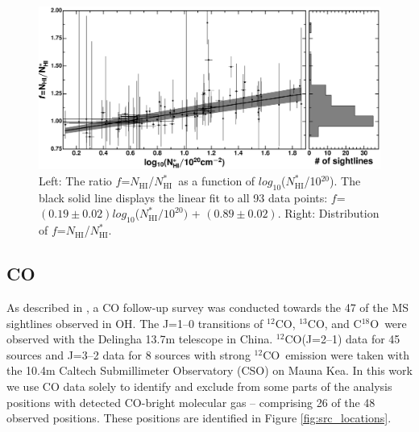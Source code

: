 \documentclass[preprint]{emulateapj}
\def\13co{$^{13}$CO}
\def\c18o{C$^{18}$O}
\def\co{$^{12}$CO}
\def\h2{H$_2$}
\def\hi{H{\sc i}}
\def\NHI{$N_\mathrm{HI}$}
\def\NHIthin{$N^{*}_\mathrm{HI}$}
\begin{document}

\begin{figure}
\includegraphics[width=1.0\linewidth]{fig/ratio_vs_nhithin.eps}
\caption{Left: The ratio $f$=\NHI/\NHIthin\ as a function of $log_{10}$(\NHIthin/10$^{20}$). The black solid line displays the linear fit to all 93 data points: $f$=$(0.19\pm0.02)log_{10}$(\NHIthin$/10^{20})$ + $(0.89\pm0.02)$. Right: Distribution of $f$=\NHI/\NHIthin.}
\label{fig:ratio_vs_nhithin}
\end{figure}

\subsection{CO}
\label{subsec:CO}
As described in \citet{Li2017}, a CO follow-up survey was conducted towards the 47 of the MS sightlines observed in OH. The J=1--0 transitions of \co, \13co, and \c18o\ were observed with the Delingha 13.7m telescope in China. \co(J=2--1) data for 45 sources and J=3--2 data for 8 sources with strong \co\ emission were taken with the 10.4m Caltech Submillimeter Observatory (CSO) on Mauna Kea. In this work we use CO data solely to identify and exclude from some parts of the analysis positions with detected CO-bright molecular gas -- {\color{blue} comprising 26 of the 48 observed positions}. These positions are identified in Figure \ref{fig:src_locations}. %
    
\end{document}
